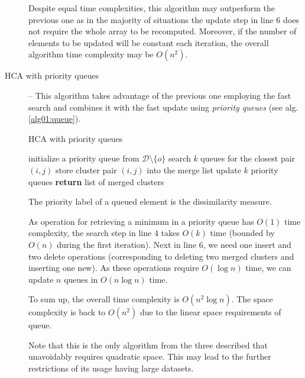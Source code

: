 \begin{description}
	 \begin{rem}
	 	Despite equal time complexities, this algorithm may outperform the previous one as in the majority of situations the update step in line $6$ does not require the whole array to be recomputed. Moreover, if the number of elements to be updated will be constant each iteration, the overall algorithm time complexity may be $O(n^2)$. 
	 \end{rem}
	 
	 \item[HCA with priority queues] -- This algorithm takes advantage of the previous one employing the fast search and combines it with the fast update using \emph{priority queues} (see alg. \ref{alg01:queue}).
	 
	 \begin{algorithm}
	 	\caption{HCA with priority queues}
	 	\label{alg01:queue}
	 	\begin{algorithmic}[1]
	 		\State initialize a priority queue from $\mathcal{D} \setminus \{o\}$
	 		\EndFor
	 		\State search $k$ queues for the closest pair $(i,j)$ 
	 		\State store cluster pair $(i,j)$ into the merge list 
	 		\State update $k$ priority queues 
	 		\EndFor
	 		\State \textbf{return} list of merged clusters
	 		\EndProcedure
	 	\end{algorithmic}
	 \end{algorithm}
 
 	The priority label of a queued element is the dissimilarity measure. 
 	
 	As operation for retrieving a minimum in a priority queue has $O(1)$ time complexity, the search step in line $4$ takes $O(k)$ time (bounded by $O(n)$ during the first iteration). Next in line $6$, we need one insert and two delete operations (corresponding to deleting two merged clusters and inserting one new). As these operations require $O(\log{n})$ time, we can update $n$ queues in $O(n\log{n})$ time.
 	
 	To sum up, the overall time complexity is $O(n^2\log{n})$. The space complexity is back to $O(n^2)$ due to the linear space requirements of queue.
 	
 	\begin{rem}
 		Note that this is the only algorithm from the three described that unavoidably requires quadratic space. This may lead to the further restrictions of its usage having large datasets.
 	\end{rem}

\end{description}

